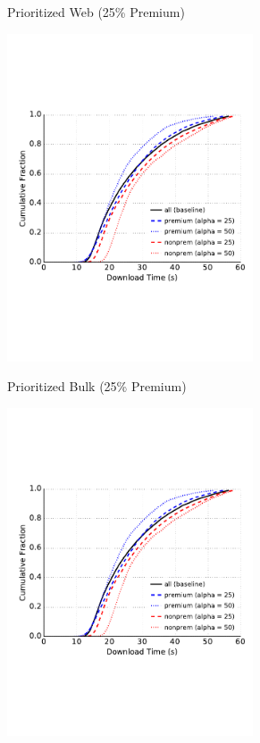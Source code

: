 \begin{figure}
\begin{subfigure}[t]{0.49\textwidth}
		\caption{Prioritized Web (25\% Premium)}
\label{fig:modifier_pr25_web}
	\end{subfigure}
	\begin{subfigure}[t]{0.49\textwidth} \centering
\includegraphics[trim={0 3cm 0 3cm}, clip, width=0.8\textwidth]{images/modifier_pr25_bulk.pdf}
\label{fig:modifier_pr25_bulk}
		\vspace{-0.38cm}
		\caption{Prioritized Bulk (25\% Premium)}
	\end{subfigure}
	\begin{subfigure}[t]{0.49\textwidth} \centering
\includegraphics[trim={0 3cm 0 3cm}, clip, width=0.8\textwidth]{images/modifier_pr25_bulk.pdf}

\end{subfigure}
\end{figure}
